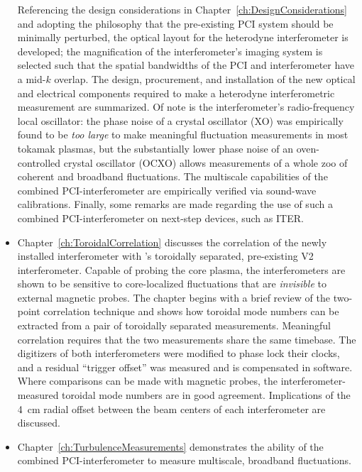\begin{itemize}
    Referencing the design considerations
    in Chapter~\ref{ch:DesignConsiderations} and
    adopting the philosophy
    that the pre-existing PCI system should be minimally perturbed,
    the optical layout for the heterodyne interferometer is developed;
    the magnification of the interferometer's imaging system
    is selected such that the spatial bandwidths
    of the PCI and interferometer have a mid-$k$ overlap.
    The design, procurement, and installation
    of the new optical and electrical components
    required to make a heterodyne interferometric measurement
    are summarized.
    Of note is the interferometer's radio-frequency local oscillator:
    the phase noise of a crystal oscillator (XO)
    was empirically found to be \emph{too large}
    to make meaningful fluctuation measurements in most tokamak plasmas, but
    the substantially lower phase noise of an
    oven-controlled crystal oscillator (OCXO)
    allows measurements of a whole zoo
    of coherent and broadband fluctuations.
    The multiscale capabilities of the combined PCI-interferometer
    are empirically verified via sound-wave calibrations.
    Finally, some remarks are made regarding
    the use of such a combined PCI-interferometer
    on next-step devices, such as ITER.
  \item Chapter~\ref{ch:ToroidalCorrelation} discusses the correlation
    of the newly installed interferometer with
    \diiid's toroidally separated, pre-existing V2 interferometer.
    Capable of probing the core plasma,
    the interferometers are shown to be sensitive
    to core-localized fluctuations
    that are \emph{invisible} to external magnetic probes.
    The chapter begins with a brief review
    of the two-point correlation technique and
    shows how toroidal mode numbers can be extracted
    from a pair of toroidally separated measurements.
    Meaningful correlation requires that
    the two measurements share the same timebase.
    The digitizers of both interferometers were modified
    to phase lock their clocks, and
    a residual ``trigger offset'' was measured
    and is compensated in software.
    Where comparisons can be made with magnetic probes,
    the interferometer-measured toroidal mode numbers
    are in good agreement.
    Implications of the \SI{4}{\centi\meter} radial offset
    between the beam centers of each interferometer are discussed.
  \item Chapter~\ref{ch:TurbulenceMeasurements} demonstrates
    the ability of the combined PCI-interferometer
    to measure multiscale, broadband fluctuations.

\end{itemize}
